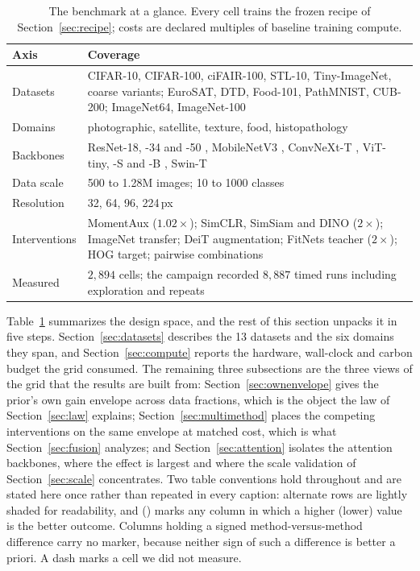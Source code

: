 \begin{table}[t]
\caption{The benchmark at a glance. Every cell trains the frozen recipe
of Section~\ref{sec:recipe}; costs are declared multiples of baseline
training compute.}
\label{tab:glance}
\centering\scriptsize
\setlength{\tabcolsep}{2.6pt}
\begin{tabular}{@{}lp{}@{}}
\toprule
\textbf{Axis} & \textbf{Coverage} \\
\midrule
Datasets & CIFAR-10, CIFAR-100, ciFAIR-100, STL-10, Tiny-ImageNet, coarse
  variants; EuroSAT, DTD, Food-101, PathMNIST, CUB-200; ImageNet64,
  ImageNet-100 \\
Domains & photographic, satellite, texture, food, histopathology \\
Backbones & ResNet-18, -34 and -50 \citep{he2016resnet}, MobileNetV3
  \citep{howard2019mobilenetv3}, ConvNeXt-T \citep{liu2022convnext},
  ViT-tiny, -S and -B \citep{dosovitskiy2021vit}, Swin-T
  \citep{liu2021swin} \\
Data scale & 500 to 1.28M images; 10 to 1000 classes \\
Resolution & 32, 64, 96, 224\,px \\
Interventions & MomentAux ($1.02\times$); SimCLR, SimSiam and DINO
  ($2\times$); ImageNet transfer; DeiT augmentation; FitNets teacher
  ($2\times$); HOG target; pairwise combinations \\
Measured & $2{,}894$ cells; the campaign recorded $8{,}887$ timed runs
  including exploration and repeats \\
\bottomrule
\end{tabular}
\end{table}

Table~\ref{tab:glance} summarizes the design space, and the rest of this
section unpacks it in five steps. Section~\ref{sec:datasets} describes
the 13 datasets and the six domains they span, and
Section~\ref{sec:compute} reports the hardware, wall-clock and carbon
budget the grid consumed. The remaining three subsections are the three
views of the grid that the results are built from:
Section~\ref{sec:ownenvelope} gives the prior's own gain envelope across
data fractions, which is the object the law of Section~\ref{sec:law}
explains; Section~\ref{sec:multimethod} places the competing
interventions on the same envelope at matched cost, which is what
Section~\ref{sec:fusion} analyzes; and Section~\ref{sec:attention}
isolates the attention backbones, where the effect is largest and where
the scale validation of Section~\ref{sec:scale} concentrates.
Two table conventions hold throughout and are stated here once rather than
repeated in every caption: alternate rows are lightly shaded for
readability, and \up{} (\down{}) marks any column in which a higher
(lower) value is the better outcome. Columns holding a signed
method-versus-method difference carry no marker, because neither sign of
such a difference is better a priori. A dash marks a cell we did not
measure.

